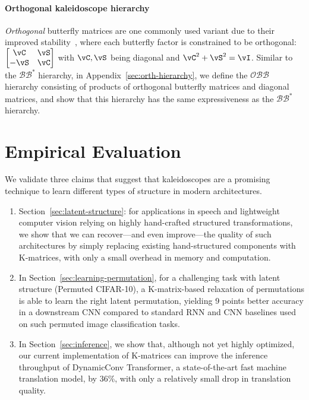 \paragraph{Orthogonal kaleidoscope hierarchy}
\textit{Orthogonal} butterfly matrices are one commonly used variant due to their improved stability~\citep{parker1995random}, where each butterfly factor is constrained to be orthogonal:
$

\begin{bmatrix} \vC & \vS \\ -\vS & \vC
\end{bmatrix}

$ with $\vC, \vS$ being diagonal and $\vC^2 + \vS^2 = \vI$.
Similar to the $\mathcal{B}\mathcal{B}^*$ hierarchy, in Appendix~\ref{sec:orth-hierarchy}, we define the $\mathcal{OBB}$ hierarchy consisting of products of orthogonal butterfly matrices and diagonal matrices, and show that this hierarchy has the same expressiveness as the $\mathcal{B}\mathcal{B}^*$ hierarchy.


\section{Empirical Evaluation}
\label{sec:experiments}

We validate three claims that suggest that kaleidoscopes are a promising technique to learn different types of structure in modern architectures.

\begin{enumerate}[topsep=0em, partopsep=0.0em, itemsep=0em, parsep=0.1em, leftmargin=2em]
  \item Section~\ref{sec:latent-structure}: for applications in speech and lightweight computer vision relying on highly hand-crafted structured transformations, we show that we can recover---and even improve---the quality of such architectures by simply replacing existing hand-structured components with K-matrices, with only a small overhead in memory and computation.
  \item In Section~\ref{sec:learning-permutation}, for a challenging task with latent structure (Permuted CIFAR-10), a K-matrix-based relaxation of permutations is able to learn the right latent permutation, yielding 9 points better accuracy in a downstream CNN compared to standard RNN and CNN baselines used on such permuted image classification tasks.
  \item In Section~\ref{sec:inference}, we show that, although not yet highly optimized, our current implementation of K-matrices can improve the inference throughput of DynamicConv Transformer, a state-of-the-art fast machine translation model, by 36\%, with only a relatively small drop in translation quality.
\end{enumerate}

